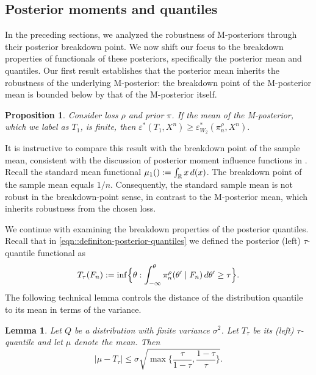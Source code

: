 \documentclass[11pt, oneside]{amsart}
\newtheorem{lemma}{Lemma}
\newtheorem{proposition}{Proposition}
\theoremstyle{definition}   %
\let\P\relax
\newcommand{\P}{\mathbb{P}}
\newcommand{\loss}{\rho}
\newcommand{\mposterior}{\pi_n^{\loss}}
\begin{document}
\subsection{Posterior moments and quantiles} \label{sec::BP-posterior-moment-quantiles}
%
In the preceding sections, we analyzed the robustness of M-posteriors through their posterior breakdown point. We now shift our focus to the breakdown properties of functionals of these posteriors, specifically the posterior mean and quantiles. Our first result establishes that the posterior mean inherits the robustness of the underlying M-posterior: the breakdown point of the M-posterior mean is bounded below by that of the M-posterior itself.
%
%
\begin{proposition}
\label{prop::bp-of-posterior-mean}
    Consider loss \( \loss \) and prior \( \pi \). If the mean of the M-posterior, which we label as \( T_1 \), is finite, then \( \varepsilon^*(T_1, X^n) \geq \varepsilon^*_{W_2}(\pi^\rho_n, X^n).\)
\end{proposition}

It is instructive to compare this result with the breakdown point of the sample mean, consistent with the discussion of posterior moment influence functions in . Recall the standard mean functional $\mu_1(\P):=\int_{\mathbb{R}} x \, d\P(x)$. The breakdown point of the sample mean equals $1/n$. Consequently, the standard sample mean is not robust in the breakdown-point sense, in contrast to the M-posterior mean, which inherits robustness from the chosen loss.

We continue with examining the breakdown properties of the posterior quantiles. Recall that in \eqref{eqn::definiton-posterior-quantiles} we defined the posterior (left) $\tau$-quantile functional as
%
\begin{equation*}
    T_\tau(F_n)
    :=
    \inf \Bigl \{ \theta : \int_{-\infty}^{\theta} \mposterior (\theta' \mid F_n)\, d\theta' \geq \tau\Bigr\}.
\end{equation*}
%
The following technical lemma controls the distance of the distribution quantile to its mean in terms of the variance.

\begin{lemma}
\label{lemma::bound-on-quantiles}
    Let \( Q \) be a distribution with finite variance \( \sigma^2\). Let \( T_\tau\) be its (left) \( \tau\)-quantile and let \( \mu \) denote the mean. Then
    \[
        \bigl | \mu - T_\tau \bigr| \leq \sigma \sqrt{\max\Big \{ \frac{\tau}{1-\tau}, \frac{1 - \tau}{\tau} \Big \}}.
    \]
\end{lemma}
\end{document}
